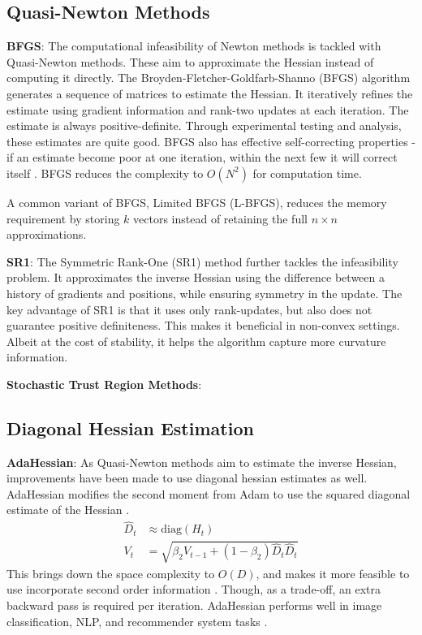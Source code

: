 \subsection{Quasi-Newton Methods}
\textbf{BFGS}: The computational infeasibility of Newton methods is tackled with Quasi-Newton methods. These aim to approximate the Hessian instead of computing it directly. The Broyden-Fletcher-Goldfarb-Shanno (BFGS) algorithm generates a sequence of matrices to estimate the Hessian. It iteratively refines the estimate using gradient information and rank-two updates at each iteration. The estimate is always positive-definite. Through experimental testing and analysis, these estimates are quite good. BFGS also has effective self-correcting properties - if an estimate become poor at one iteration, within the next few it will correct itself \citep{NoceWrig06}. BFGS reduces the complexity to $O(N^2)$ for computation time.  

A common variant of BFGS, Limited BFGS (L-BFGS), reduces the memory requirement by storing $k$ vectors instead of retaining the full $n\times n$ approximations.

\textbf{SR1}: The Symmetric Rank-One (SR1) method further tackles the infeasibility problem. It approximates the inverse Hessian using the difference between a history of gradients and positions, while ensuring symmetry in the update. The key advantage of SR1 is that it uses only rank-updates, but also does not guarantee positive definiteness. This makes it beneficial in non-convex settings. Albeit at the cost of stability, it helps the algorithm capture more curvature information.

\textbf{Stochastic Trust Region Methods}: 

\subsection{Diagonal Hessian Estimation} \label{sec:diag_hessian}
\textbf{AdaHessian}: As Quasi-Newton methods aim to estimate the inverse Hessian, improvements have been made to use diagonal hessian estimates as well. AdaHessian modifies the second moment from Adam to use the squared diagonal estimate of the Hessian \citep{yao2021adahessian}.
\begin{align}
    \hat{D}_t &\approx \text{diag}(H_t) \\
    V_t &= \sqrt{\beta_2 V_{t-1} + (1 - \beta_2) \hat{D}_t\hat{D}_t}
\end{align}
This brings down the space complexity to $O(D)$, and makes it more feasible to use incorporate second order information \citep{yao2021adahessian}. Though, as a trade-off, an extra backward pass is required per iteration. AdaHessian performs well in image classification, NLP, and recommender system tasks \citep{yao2021adahessian}.

